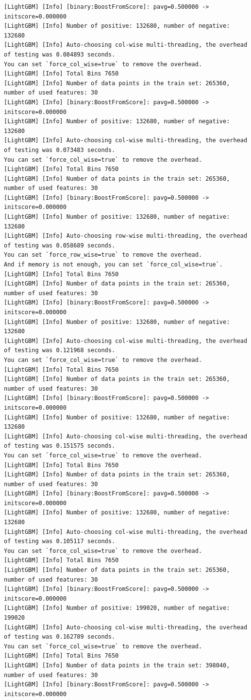 \documentclass[
  letterpaper,
  DIV=11,
  numbers=noendperiod]{scrartcl}
\begin{document}
\begin{verbatim}
[LightGBM] [Info] [binary:BoostFromScore]: pavg=0.500000 -> initscore=0.000000
[LightGBM] [Info] Number of positive: 132680, number of negative: 132680
[LightGBM] [Info] Auto-choosing col-wise multi-threading, the overhead of testing was 0.084893 seconds.
You can set `force_col_wise=true` to remove the overhead.
[LightGBM] [Info] Total Bins 7650
[LightGBM] [Info] Number of data points in the train set: 265360, number of used features: 30
[LightGBM] [Info] [binary:BoostFromScore]: pavg=0.500000 -> initscore=0.000000
[LightGBM] [Info] Number of positive: 132680, number of negative: 132680
[LightGBM] [Info] Auto-choosing col-wise multi-threading, the overhead of testing was 0.073483 seconds.
You can set `force_col_wise=true` to remove the overhead.
[LightGBM] [Info] Total Bins 7650
[LightGBM] [Info] Number of data points in the train set: 265360, number of used features: 30
[LightGBM] [Info] [binary:BoostFromScore]: pavg=0.500000 -> initscore=0.000000
[LightGBM] [Info] Number of positive: 132680, number of negative: 132680
[LightGBM] [Info] Auto-choosing row-wise multi-threading, the overhead of testing was 0.058689 seconds.
You can set `force_row_wise=true` to remove the overhead.
And if memory is not enough, you can set `force_col_wise=true`.
[LightGBM] [Info] Total Bins 7650
[LightGBM] [Info] Number of data points in the train set: 265360, number of used features: 30
[LightGBM] [Info] [binary:BoostFromScore]: pavg=0.500000 -> initscore=0.000000
[LightGBM] [Info] Number of positive: 132680, number of negative: 132680
[LightGBM] [Info] Auto-choosing col-wise multi-threading, the overhead of testing was 0.121968 seconds.
You can set `force_col_wise=true` to remove the overhead.
[LightGBM] [Info] Total Bins 7650
[LightGBM] [Info] Number of data points in the train set: 265360, number of used features: 30
[LightGBM] [Info] [binary:BoostFromScore]: pavg=0.500000 -> initscore=0.000000
[LightGBM] [Info] Number of positive: 132680, number of negative: 132680
[LightGBM] [Info] Auto-choosing col-wise multi-threading, the overhead of testing was 0.151575 seconds.
You can set `force_col_wise=true` to remove the overhead.
[LightGBM] [Info] Total Bins 7650
[LightGBM] [Info] Number of data points in the train set: 265360, number of used features: 30
[LightGBM] [Info] [binary:BoostFromScore]: pavg=0.500000 -> initscore=0.000000
[LightGBM] [Info] Number of positive: 132680, number of negative: 132680
[LightGBM] [Info] Auto-choosing col-wise multi-threading, the overhead of testing was 0.105117 seconds.
You can set `force_col_wise=true` to remove the overhead.
[LightGBM] [Info] Total Bins 7650
[LightGBM] [Info] Number of data points in the train set: 265360, number of used features: 30
[LightGBM] [Info] [binary:BoostFromScore]: pavg=0.500000 -> initscore=0.000000
[LightGBM] [Info] Number of positive: 199020, number of negative: 199020
[LightGBM] [Info] Auto-choosing col-wise multi-threading, the overhead of testing was 0.162789 seconds.
You can set `force_col_wise=true` to remove the overhead.
[LightGBM] [Info] Total Bins 7650
[LightGBM] [Info] Number of data points in the train set: 398040, number of used features: 30
[LightGBM] [Info] [binary:BoostFromScore]: pavg=0.500000 -> initscore=0.000000


\end{verbatim}
\end{document}
